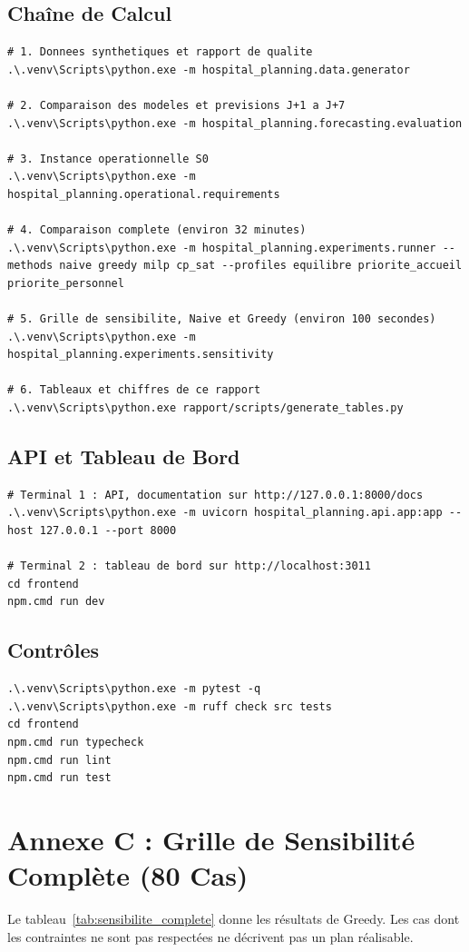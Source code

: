 \subsection*{Chaîne de Calcul}
\begin{lstlisting}[caption={Commandes de la chaîne de calcul.}]
# 1. Donnees synthetiques et rapport de qualite
.\.venv\Scripts\python.exe -m hospital_planning.data.generator

# 2. Comparaison des modeles et previsions J+1 a J+7
.\.venv\Scripts\python.exe -m hospital_planning.forecasting.evaluation

# 3. Instance operationnelle S0
.\.venv\Scripts\python.exe -m hospital_planning.operational.requirements

# 4. Comparaison complete (environ 32 minutes)
.\.venv\Scripts\python.exe -m hospital_planning.experiments.runner --methods naive greedy milp cp_sat --profiles equilibre priorite_accueil priorite_personnel

# 5. Grille de sensibilite, Naive et Greedy (environ 100 secondes)
.\.venv\Scripts\python.exe -m hospital_planning.experiments.sensitivity

# 6. Tableaux et chiffres de ce rapport
.\.venv\Scripts\python.exe rapport/scripts/generate_tables.py
\end{lstlisting}

\subsection*{API et Tableau de Bord}
\begin{lstlisting}[caption={Lancement de l'API et du tableau de bord (deux terminaux).}]
# Terminal 1 : API, documentation sur http://127.0.0.1:8000/docs
.\.venv\Scripts\python.exe -m uvicorn hospital_planning.api.app:app --host 127.0.0.1 --port 8000

# Terminal 2 : tableau de bord sur http://localhost:3011
cd frontend
npm.cmd run dev
\end{lstlisting}

\subsection*{Contrôles}
\begin{lstlisting}[caption={Tests et analyse statique.}]
.\.venv\Scripts\python.exe -m pytest -q
.\.venv\Scripts\python.exe -m ruff check src tests
cd frontend
npm.cmd run typecheck
npm.cmd run lint
npm.cmd run test
\end{lstlisting}

\newpage
\section*{Annexe C : Grille de Sensibilité Complète (80 Cas)}

Le tableau~\ref{tab:sensibilite_complete} donne les résultats de Greedy. Les cas dont les contraintes ne sont pas respectées ne décrivent pas un plan réalisable.


